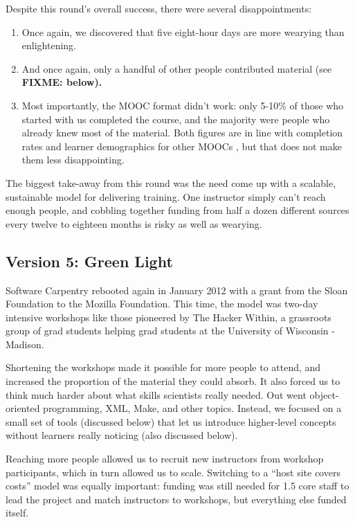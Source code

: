 \documentclass[10pt,a4paper,twocolumn]{article}
\newcommand{\fixme}[1]{\bf{FIXME: {#1}}}
\begin{document}
Despite this round's overall success, there were several
disappointments:

\begin{enumerate}

\item
  Once again, we discovered that five eight-hour days are more wearying
  than enlightening.

\item
  And once again, only a handful of other people contributed material
  (see \fixme{below}).

\item
  Most importantly, the MOOC format didn't work: only 5-10\% of those
  who started with us completed the course, and the majority were
  people who already knew most of the material. Both figures are in
  line with completion rates and learner demographics for other MOOCs
  \cite{jordan2013}, but that does not make them less disappointing.

\end{enumerate}

The biggest take-away from this round was the need come up with a
scalable, sustainable model for delivering training. One instructor
simply can't reach enough people, and cobbling together funding from
half a dozen different sources every twelve to eighteen months is
risky as well as wearying.

\subsection*{Version 5: Green Light}

Software Carpentry rebooted again in January 2012 with a grant from
the Sloan Foundation to the Mozilla Foundation.  This time, the model
was two-day intensive workshops like those pioneered by The Hacker
Within, a grassroots group of grad students helping grad students at
the University of Wisconsin - Madison.

Shortening the workshops made it possible for more people to attend,
and increased the proportion of the material they could absorb. It
also forced us to think much harder about what skills scientists
really needed. Out went object-oriented programming, XML, Make, and
other topics.  Instead, we focused on a small set of tools (discussed
below) that let us introduce higher-level concepts without learners
really noticing (also discussed below).

Reaching more people allowed us to recruit new instructors from
workshop participants, which in turn allowed us to scale. Switching to
a ``host site covers costs'' model was equally important: funding was
still needed for 1.5 core staff to lead the project and match
instructors to workshops, but everything else funded itself.
\end{document}
